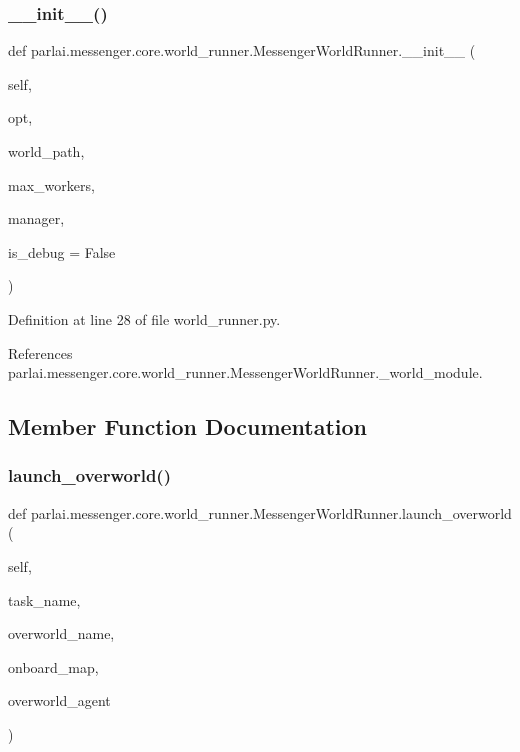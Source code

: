 \subsubsection{\texorpdfstring{\+\_\+\+\_\+init\+\_\+\+\_\+()}{\_\_init\_\_()}}
{\footnotesize\ttfamily def parlai.\+messenger.\+core.\+world\+\_\+runner.\+Messenger\+World\+Runner.\+\_\+\+\_\+init\+\_\+\+\_\+ (\begin{DoxyParamCaption}\item[{}]{self,  }\item[{}]{opt,  }\item[{}]{world\+\_\+path,  }\item[{}]{max\+\_\+workers,  }\item[{}]{manager,  }\item[{}]{is\+\_\+debug = {\ttfamily False} }\end{DoxyParamCaption})}



Definition at line 28 of file world\+\_\+runner.\+py.



References parlai.\+messenger.\+core.\+world\+\_\+runner.\+Messenger\+World\+Runner.\+\_\+world\+\_\+module.



\subsection{Member Function Documentation}
\mbox{\label{classparlai_1_1messenger_1_1core_1_1world__runner_1_1MessengerWorldRunner_a9e8caf7821b9d5bd3fedf09ef1a1b027}} 
\subsubsection{\texorpdfstring{launch\+\_\+overworld()}{launch\_overworld()}}
{\footnotesize\ttfamily def parlai.\+messenger.\+core.\+world\+\_\+runner.\+Messenger\+World\+Runner.\+launch\+\_\+overworld (\begin{DoxyParamCaption}\item[{}]{self,  }\item[{}]{task\+\_\+name,  }\item[{}]{overworld\+\_\+name,  }\item[{}]{onboard\+\_\+map,  }\item[{}]{overworld\+\_\+agent }\end{DoxyParamCaption})}

